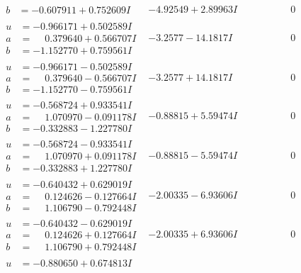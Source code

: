 \documentclass[1p]{elsarticle_modified}
\theoremstyle{definition}
\begin{document}
$$\begin{array}{c|c|c}
\begin{aligned}
b &= -0.607911 + 0.752609 I\end{aligned}
 & -4.92549 + 2.89963 I & \phantom{-0.000000 } 0 \\ \hline\begin{aligned}
u &= -0.966171 + 0.502589 I \\
a &= \phantom{-}0.379640 + 0.566707 I \\
b &= -1.152770 + 0.759561 I\end{aligned}
 & -3.2577 - 14.1817 I & \phantom{-0.000000 } 0 \\ \hline\begin{aligned}
u &= -0.966171 - 0.502589 I \\
a &= \phantom{-}0.379640 - 0.566707 I \\
b &= -1.152770 - 0.759561 I\end{aligned}
 & -3.2577 + 14.1817 I & \phantom{-0.000000 } 0 \\ \hline\begin{aligned}
u &= -0.568724 + 0.933541 I \\
a &= \phantom{-}1.070970 - 0.091178 I \\
b &= -0.332883 - 1.227780 I\end{aligned}
 & -0.88815 + 5.59474 I & \phantom{-0.000000 } 0 \\ \hline\begin{aligned}
u &= -0.568724 - 0.933541 I \\
a &= \phantom{-}1.070970 + 0.091178 I \\
b &= -0.332883 + 1.227780 I\end{aligned}
 & -0.88815 - 5.59474 I & \phantom{-0.000000 } 0 \\ \hline\begin{aligned}
u &= -0.640432 + 0.629019 I \\
a &= \phantom{-}0.124626 - 0.127664 I \\
b &= \phantom{-}1.106790 - 0.792448 I\end{aligned}
 & -2.00335 - 6.93606 I & \phantom{-0.000000 } 0 \\ \hline\begin{aligned}
u &= -0.640432 - 0.629019 I \\
a &= \phantom{-}0.124626 + 0.127664 I \\
b &= \phantom{-}1.106790 + 0.792448 I\end{aligned}
 & -2.00335 + 6.93606 I & \phantom{-0.000000 } 0 \\ \hline\begin{aligned}
u &= -0.880650 + 0.674813 I \\

\end{aligned}
\end{array}$$
\end{document}
